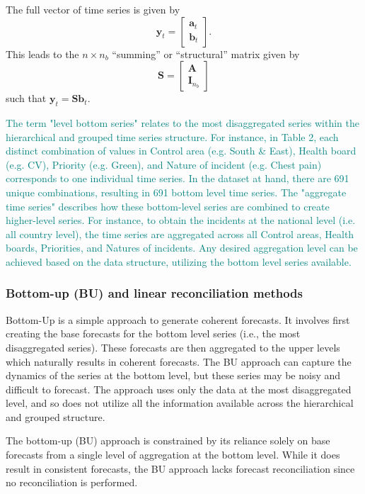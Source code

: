 \documentclass[
  authoryear,
  preprint,
  3p]{elsarticle}
\begin{document}
The full vector of time series is given by \[
 \bm{y}_t = \begin{bmatrix}\bm{a}_t \\\bm{b}_t\end{bmatrix}.
\] This leads to the \(n\times n_b\) ``summing'' or ``structural''
matrix given by \[
  \bm{S} = \begin{bmatrix}\bm{A} \\ \bm{I}_{n_b}\end{bmatrix}
\] such that \(\bm{y}_t = \bm{S}\bm{b}_t\).

\textcolor{teal}{The term "level bottom series" relates to the most disaggregated series within the hierarchical and grouped time series structure. For instance, in Table 2, each distinct combination of values in Control area (e.g. South \& East), Health board (e.g. CV), Priority (e.g. Green), and Nature of incident (e.g. Chest pain) corresponds to one individual time series. In the dataset at hand, there are 691 unique combinations, resulting in 691 bottom level time series. The "aggregate time series" describes how these bottom-level series are combined to create higher-level series. For instance, to obtain the incidents at the national level (i.e. all country level), the time series are aggregated across all Control areas, Health boards, Priorities, and Natures of incidents. Any desired aggregation level can be achieved based on the data structure, utilizing the bottom level series available.}

\hypertarget{bottom-up-bu-and-linear-reconciliation-methods}{%
\subsubsection{Bottom-up (BU) and linear reconciliation
methods}\label{bottom-up-bu-and-linear-reconciliation-methods}}

Bottom-Up is a simple approach to generate coherent forecasts. It
involves first creating the base forecasts for the bottom level series
(i.e., the most disaggregated series). These forecasts are then
aggregated to the upper levels which naturally results in coherent
forecasts. The BU approach can capture the dynamics of the series at the
bottom level, but these series may be noisy and difficult to forecast.
The approach uses only the data at the most disaggregated level, and so
does not utilize all the information available across the hierarchical
and grouped structure.

The bottom-up (BU) approach is constrained by its reliance solely on
base forecasts from a single level of aggregation at the bottom level.
While it does result in consistent forecasts, the BU approach lacks
forecast reconciliation since no reconciliation is performed.
\end{document}
